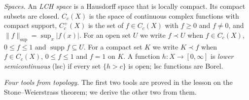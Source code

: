 \documentclass[
  english,
  11pt,
  a4paper,
]{article}
\begin{document}
\emph{Spaces.} An \emph{LCH space} is a Hausdorff space that is locally
compact. Its compact subsets are closed. \(C_c(X)\) is the space of
continuous complex functions with compact support, \(C_c^+(X)\) is the
set of \(f\in C_c(X)\) with \(f\geq0\) and \(f\neq0\), and
\(\|f\|_{\sup}=\sup_x|f(x)|\). For an open set \(U\) we write
\(f\prec U\) when \(f\in C_c(X)\), \(0\leq f\leq1\) and
\(\operatorname{supp}f\subseteq U\). For a compact set \(K\) we write
\(K\prec f\) when \(f\in C_c(X)\), \(0\leq f\leq 1\) and \(f=1\) on
\(K\). A function \(h\colon X\to[0,\infty]\) is \emph{lower
semicontinuous} (lsc) if every set \(\{h>c\}\) is open; lsc functions
are Borel.

\emph{Four tools from topology.} The first two tools are proved in the
lesson on the Stone--Weierstrass theorem; we derive the other two from
them.
\end{document}
